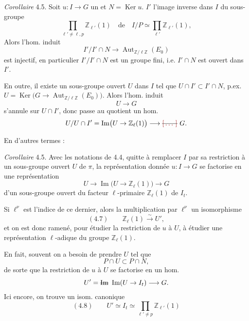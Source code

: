 \documentclass[11pt,a4paper]{article}
\begin{document}
\emph{Corollaire} 4.5. Soit $u : I \to G$ un \struck{\ill{}}  et $N = \operatorname{Ker} u$.  $I'$ l'image inverse dans $I$ du sous-groupe
\[
  \prod_{\ell' \neq \ell, p} \mathbb{Z}_{\ell'}(1) \quad \text{de} \quad I/P \simeq \prod_{\ell'} \mathbb{Z}_{\ell'}(1) ,
\]
 Alors l'hom. induit
\[
  I'/I' \cap N \longrightarrow \operatorname{Aut}_{\mathbb{Z}/\ell\mathbb{Z}}(E_0)
\]
est injectif, en particulier $I'/I' \cap N$ est un groupe fini, i.e. $I' \cap N$ est ouvert dans $I'$.

En outre, il existe un  sous-groupe ouvert $U$ dans $I$ tel que $U \cap I' \subset I' \cap N$, p.ex.  $U = \operatorname{Ker}\bigl(G \to \operatorname{Aut}_{\mathbb{Z}/\ell\mathbb{Z}}(E_0)\bigr)$. Alors l'hom. induit
\[
  U \longrightarrow G
\]
s'annule sur $U \cap I'$, donc passe au quotient  un hom.
\[
  U/U \cap I' = \operatorname{Im}\bigl(U \to \mathbb{Z}_\ell(1)\bigr) \longrightarrow \text{\struck{\ill{}}}\ G .
\]

En d'autres termes :

\emph{Corollaire} 4.5. Avec les notations de 4.4, quitte à remplacer $I$ par sa restriction à un sous-groupe  ouvert $U$ de $\pi$, la représentation donnée $u : I \to G$ se factorise en une représentation
\[
  U \longrightarrow \operatorname{Im}\bigl(U \to \mathbb{Z}_\ell(1)\bigr) \longrightarrow G
\]
d'un sous-groupe ouvert  \struck{\ill{}} du facteur  $\ell$-primaire $\mathbb{Z}_\ell(1)$ de $I_t$.

Si $\ell^{\nu}$ est l'indice de ce dernier, alors la multiplication par $\ell^{\nu}$  un isomorphisme
\[
  (4.7) \qquad \mathbb{Z}_\ell(1) \xrightarrow{\ \sim\ } U' ,
\]
et on est donc ramené, pour étudier la restriction de $u$ à $U$, à étudier une représentation $\ell$-adique du groupe $\mathbb{Z}_\ell(1)$.

En fait, souvent on a besoin de prendre $U$ tel que 
\[
  P \cap U \subset P \cap N ,
\]
de sorte que la restriction de $u$ à $U$ se factorise en un hom.
\[
  U' = \text{\struck{$\operatorname{Im}$}}\ \operatorname{Im}(U \to I_t) \longrightarrow G .
\]
Ici encore, on trouve un isom. canonique
\[
  (4.8) \qquad U' \simeq I_t \simeq \prod_{\ell' \neq p} \mathbb{Z}_{\ell'}(1)
\]
\end{document}
